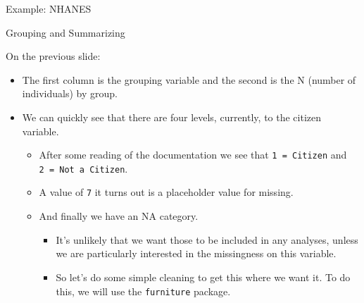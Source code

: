 \documentclass[ignorenonframetext,]{beamer}
\providecommand{\tightlist}{%
\setlength{\itemsep}{0pt}\setlength{\parskip}{0pt}}
\begin{document}
\begin{frame}[fragile]{Example: NHANES}

\begin{block}{Grouping and Summarizing}

On the previous slide:

\begin{itemize}
\tightlist
\item
  The first column is the grouping variable and the second is the N
  (number of individuals) by group.
\item
  We can quickly see that there are four levels, currently, to the
  citizen variable.

  \begin{itemize}
  \tightlist
  \item
    After some reading of the documentation we see that
    \texttt{1\ =\ Citizen} and \texttt{2\ =\ Not\ a\ Citizen}.
  \item
    A value of \texttt{7} it turns out is a placeholder value for
    missing.
  \item
    And finally we have an NA category.

    \begin{itemize}
    \tightlist
    \item
      It's unlikely that we want those to be included in any analyses,
      unless we are particularly interested in the missingness on this
      variable.
    \item
      So let's do some simple cleaning to get this where we want it. To
      do this, we will use the \texttt{furniture} package.
    \end{itemize}
  \end{itemize}
\end{itemize}

\end{block}

\end{frame}
\end{document}
